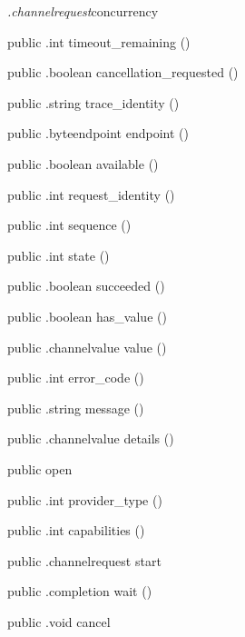 \begin{CrexxClass}{\textit{.channelrequest}}{concurrency}
\begin{Members}
    \Method
      {public}
      {.int}
      {timeout\_remaining}
      {()}

    \Method
      {public}
      {.boolean}
      {cancellation\_requested}
      {()}

    \Method
      {public}
      {.string}
      {trace\_identity}
      {()}

    \Method
      {public}
      {.byteendpoint}
      {endpoint}
      {()}

    \Method
      {public}
      {.boolean}
      {available}
      {()}

    \Method
      {public}
      {.int}
      {request\_identity}
      {()}

    \Method
      {public}
      {.int}
      {sequence}
      {()}

    \Method
      {public}
      {.int}
      {state}
      {()}

    \Method
      {public}
      {.boolean}
      {succeeded}
      {()}

    \Method
      {public}
      {.boolean}
      {has\_value}
      {()}

    \Method
      {public}
      {.channelvalue}
      {value}
      {()}

    \Method
      {public}
      {.int}
      {error\_code}
      {()}

    \Method
      {public}
      {.string}
      {message}
      {()}

    \Method
      {public}
      {.channelvalue}
      {details}
      {()}

    \Factory
      {public}
      {open}
      {}

    \Method
      {public}
      {.int}
      {provider\_type}
      {()}

    \Method
      {public}
      {.int}
      {capabilities}
      {()}

    \Method
      {public}
      {.channelrequest}
      {start}
      {}

    \Method
      {public}
      {.completion}
      {wait}
      {()}

    \Method
      {public}
      {.void}
      {cancel}
      {}


\end{Members}
\end{CrexxClass}
